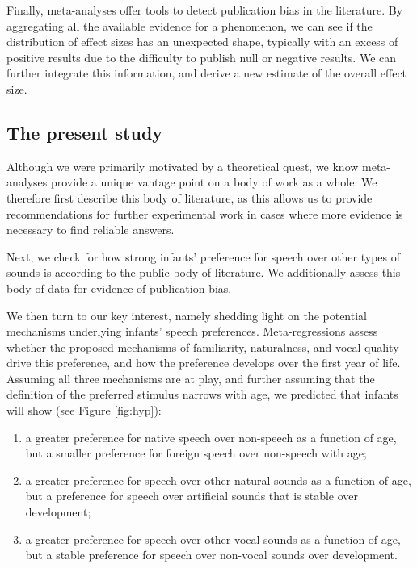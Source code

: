 \documentclass[man]{apa6}
\providecommand{\tightlist}{%
  \setlength{\itemsep}{0pt}\setlength{\parskip}{0pt}}
\begin{document}
Finally, meta-analyses offer tools to detect publication bias in the literature. By aggregating all the available evidence for a phenomenon, we can see if the distribution of effect sizes has an unexpected shape, typically with an excess of positive results due to the difficulty to publish null or negative results. We can further integrate this information, and derive a new estimate of the overall effect size.

\hypertarget{the-present-study}{%
\subsection{The present study}\label{the-present-study}}

Although we were primarily motivated by a theoretical quest, we know meta-analyses provide a unique vantage point on a body of work as a whole. We therefore first describe this body of literature, as this allows us to provide recommendations for further experimental work in cases where more evidence is necessary to find reliable answers.

Next, we check for how strong infants' preference for speech over other types of sounds is according to the public body of literature. We additionally assess this body of data for evidence of publication bias.

We then turn to our key interest, namely shedding light on the potential mechanisms underlying infants' speech preferences. Meta-regressions assess whether the proposed mechanisms of familiarity, naturalness, and vocal quality drive this preference, and how the preference develops over the first year of life. Assuming all three mechanisms are at play, and further assuming that the definition of the preferred stimulus narrows with age, we predicted that infants will show (see Figure \ref{fig:hyp}):

\begin{enumerate}
\def\labelenumi{\arabic{enumi}.}
\tightlist
\item
  a greater preference for native speech over non-speech as a function of age, but a smaller preference for foreign speech over non-speech with age;
\item
  a greater preference for speech over other natural sounds as a function of age, but a preference for speech over artificial sounds that is stable over development;
\item
  a greater preference for speech over other vocal sounds as a function of age, but a stable preference for speech over non-vocal sounds over development.
\end{enumerate}
\end{document}
